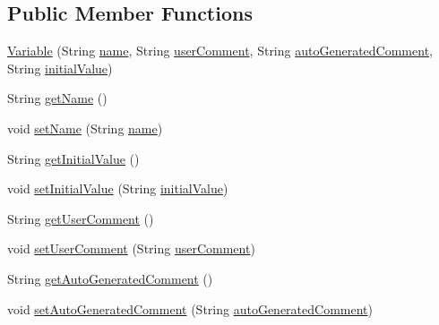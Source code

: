 \subsection*{Public Member Functions}
\begin{DoxyCompactItemize}
\item 
\hyperlink{classit_1_1isislab_1_1masonhelperdocumentation_1_1_o_d_d_1_1_variable_ae6b85864343cc5ac3ae6c65395f7c7df}{Variable} (String \hyperlink{classit_1_1isislab_1_1masonhelperdocumentation_1_1_o_d_d_1_1_variable_acf7d0255e957f01bd74e72a81209d3ad}{name}, String \hyperlink{classit_1_1isislab_1_1masonhelperdocumentation_1_1_o_d_d_1_1_variable_abc4f019f82f47614b2b62743799dc7b5}{user\-Comment}, String \hyperlink{classit_1_1isislab_1_1masonhelperdocumentation_1_1_o_d_d_1_1_variable_a66bdb6cd067ee33adcd4556f5b672f23}{auto\-Generated\-Comment}, String \hyperlink{classit_1_1isislab_1_1masonhelperdocumentation_1_1_o_d_d_1_1_variable_abf11129fa15afb4375d1e040728de05d}{initial\-Value})
\item 
String \hyperlink{classit_1_1isislab_1_1masonhelperdocumentation_1_1_o_d_d_1_1_variable_a15779a85c81c7b194819649cfa125008}{get\-Name} ()
\item 
void \hyperlink{classit_1_1isislab_1_1masonhelperdocumentation_1_1_o_d_d_1_1_variable_ad5c66ce18d66e658f3fb70f341d3476f}{set\-Name} (String \hyperlink{classit_1_1isislab_1_1masonhelperdocumentation_1_1_o_d_d_1_1_variable_acf7d0255e957f01bd74e72a81209d3ad}{name})
\item 
String \hyperlink{classit_1_1isislab_1_1masonhelperdocumentation_1_1_o_d_d_1_1_variable_a340728b74ab3f3b784dbb85dde0e82e6}{get\-Initial\-Value} ()
\item 
void \hyperlink{classit_1_1isislab_1_1masonhelperdocumentation_1_1_o_d_d_1_1_variable_a350c168d7abd9d602d912dee3bb6bb51}{set\-Initial\-Value} (String \hyperlink{classit_1_1isislab_1_1masonhelperdocumentation_1_1_o_d_d_1_1_variable_abf11129fa15afb4375d1e040728de05d}{initial\-Value})
\item 
String \hyperlink{classit_1_1isislab_1_1masonhelperdocumentation_1_1_o_d_d_1_1_variable_abe1cf0930d61cafe6d0800eb6b43eaf3}{get\-User\-Comment} ()
\item 
void \hyperlink{classit_1_1isislab_1_1masonhelperdocumentation_1_1_o_d_d_1_1_variable_adb16810a23c26422f158468a7581d804}{set\-User\-Comment} (String \hyperlink{classit_1_1isislab_1_1masonhelperdocumentation_1_1_o_d_d_1_1_variable_abc4f019f82f47614b2b62743799dc7b5}{user\-Comment})
\item 
String \hyperlink{classit_1_1isislab_1_1masonhelperdocumentation_1_1_o_d_d_1_1_variable_a6785690c05bc7616e7737e2e5f9b3bec}{get\-Auto\-Generated\-Comment} ()
\item 
void \hyperlink{classit_1_1isislab_1_1masonhelperdocumentation_1_1_o_d_d_1_1_variable_ae38edd4c061e538f472e655dd71d7e5f}{set\-Auto\-Generated\-Comment} (String \hyperlink{classit_1_1isislab_1_1masonhelperdocumentation_1_1_o_d_d_1_1_variable_a66bdb6cd067ee33adcd4556f5b672f23}{auto\-Generated\-Comment})
\end{DoxyCompactItemize}
